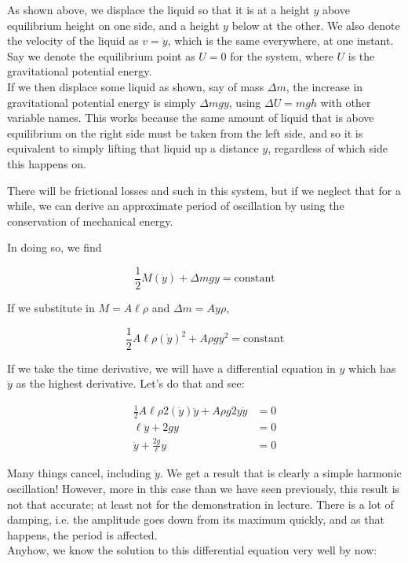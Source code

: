 As shown above, we displace the liquid so that it is at a height $y$ above equilibrium height on one side, and a height $y$ below at the other. We also denote the velocity of the liquid as $v = \dot{y}$, which is the same everywhere, at one instant.\\
Say we denote the equilibrium point as $U = 0$ for the system, where $U$ is the gravitational potential energy.\\
If we then displace some liquid as shown, say of mass $\Delta m$, the increase in gravitational potential energy is simply $\Delta m g y$, using $\Delta U = m g h$ with other variable names. This works because the same amount of liquid that is above equilibrium on the right side must be taken from the left side, and so it is equivalent to simply lifting that liquid up a distance $y$, regardless of which side this happens on.

There will be frictional losses and such in this system, but if we neglect that for a while, we can derive an approximate period of oscillation by using the conservation of mechanical energy.

In doing so, we find

\begin{equation}
\frac{1}{2} M (\dot{y}) + \Delta m g y = \text{constant}
\end{equation}

If we substitute in $M = A \ell \rho$ and $\Delta m = A y \rho$,

\begin{equation}
\frac{1}{2} A \ell \rho (\dot{y})^2 + A \rho g y^2 = \text{constant}
\end{equation}

If we take the time derivative, we will have a differential equation in $y$ which has $\ddot{y}$ as the highest derivative. Let's do that and see:

\begin{align}
\frac{1}{2} A \ell \rho 2 (\dot{y}) \ddot{y} + A \rho g 2 y \dot{y} &= 0\\
\ell \ddot{y} +  2 g y &= 0\\
\ddot{y} +  \frac{2 g}{\ell} y &= 0
\end{align}

Many things cancel, including $\dot{y}$. We get a result that is clearly a simple harmonic oscillation! However, more in this case than we have seen previously, this result is not that accurate; at least not for the demonstration in lecture. There is a lot of damping, i.e. the amplitude goes down from its maximum quickly, and as that happens, the period is affected.\\
Anyhow, we know the solution to this differential equation very well by now:

